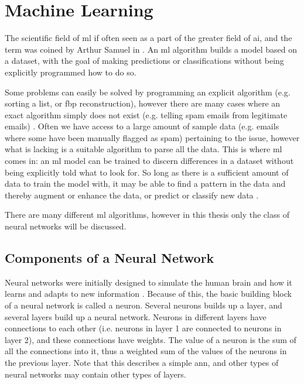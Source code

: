 \chapter{Machine Learning}
\label{sec:ml}
The scientific field of \acrfull{ml} if often seen as a part of the greater field of \acrfull{ai}\cite[3]{Alpaydin10}, and the term was coined by Arthur Samuel in \citeyear{samuelmachinelearning} \cite{samuelmachinelearning}. An \acrshort{ml} algorithm builds a model based on a dataset, with the goal of making predictions or classifications without being explicitly programmed how to do so. 

Some problems can easily be solved by programming an explicit algorithm (e.g. sorting a list, or \acrshort{fbp} reconstruction), however there are many cases where an exact algorithm simply does not exist (e.g. telling spam emails from legitimate emails) \cite[1]{Alpaydin10}. Often we have access to a large amount of sample data (e.g. emails where some have been manually flagged as spam) pertaining to the issue, however what is lacking is a suitable algorithm to parse all the data. This is where \acrshort{ml} comes in: an \acrshort{ml} model can be trained to discern differences in a dataset without being explicitly told what to look for. So long as there is a sufficient amount of data to train the model with, it may be able to find a pattern in the data and thereby augment or enhance the data, or predict or classify new data \cite[2-4]{Alpaydin10}. 

There are many different \acrshort{ml} algorithms, however in this thesis only the class of neural networks will be discussed. 

\section{Components of a Neural Network}
Neural networks were initially designed to simulate the human brain and how it learns and adapts to new information \cite{McCulloch1943}. Because of this, the basic building block of a neural network is called a neuron. Several neurons builds up a layer, and several layers build up a neural network. Neurons in different layers have connections to each other (i.e. neurons in layer 1 are connected to neurons in layer 2), and these connections have weights. The value of a neuron is the sum of all the connections into it, thus a weighted sum of the values of the neurons in the previous layer. Note that this describes a simple \acrfull{ann}, and other types of neural networks may contain other types of layers. 

